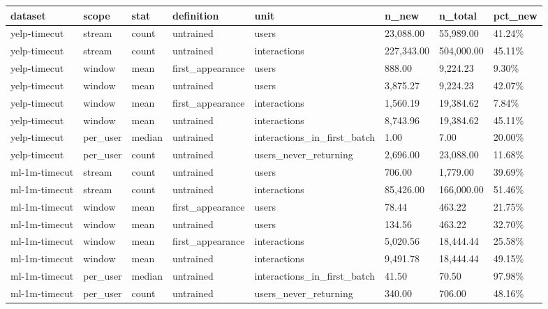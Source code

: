 \begin{tabular}{llllllll}
\toprule
dataset & scope & stat & definition & unit & n_new & n_total & pct_new \\
\midrule
yelp-timecut & stream & count & untrained & users & 23,088.00 & 55,989.00 & 41.24\% \\
yelp-timecut & stream & count & untrained & interactions & 227,343.00 & 504,000.00 & 45.11\% \\
yelp-timecut & window & mean & first_appearance & users & 888.00 & 9,224.23 & 9.30\% \\
yelp-timecut & window & mean & untrained & users & 3,875.27 & 9,224.23 & 42.07\% \\
yelp-timecut & window & mean & first_appearance & interactions & 1,560.19 & 19,384.62 & 7.84\% \\
yelp-timecut & window & mean & untrained & interactions & 8,743.96 & 19,384.62 & 45.11\% \\
yelp-timecut & per_user & median & untrained & interactions_in_first_batch & 1.00 & 7.00 & 20.00\% \\
yelp-timecut & per_user & count & untrained & users_never_returning & 2,696.00 & 23,088.00 & 11.68\% \\
ml-1m-timecut & stream & count & untrained & users & 706.00 & 1,779.00 & 39.69\% \\
ml-1m-timecut & stream & count & untrained & interactions & 85,426.00 & 166,000.00 & 51.46\% \\
ml-1m-timecut & window & mean & first_appearance & users & 78.44 & 463.22 & 21.75\% \\
ml-1m-timecut & window & mean & untrained & users & 134.56 & 463.22 & 32.70\% \\
ml-1m-timecut & window & mean & first_appearance & interactions & 5,020.56 & 18,444.44 & 25.58\% \\
ml-1m-timecut & window & mean & untrained & interactions & 9,491.78 & 18,444.44 & 49.15\% \\
ml-1m-timecut & per_user & median & untrained & interactions_in_first_batch & 41.50 & 70.50 & 97.98\% \\
ml-1m-timecut & per_user & count & untrained & users_never_returning & 340.00 & 706.00 & 48.16\% \\
\bottomrule
\end{tabular}
